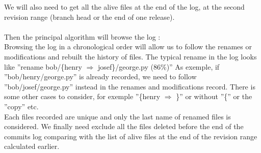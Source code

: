 We will also need to get all the alive files at the end of the log, at the second revision range (branch head or the end of one release).\\\\
Then the principal algorithm will browse the log :\\
Browsing the log in a chronological order will allow us to follow the renames or modifications and rebuilt the history of files.
The typical rename in the log looks like ''rename bob/\{henry $\Rightarrow$ josef\}/george.py (86\%)''
As exemple, if ''bob/henry/george.py'' is already recorded, we need to follow ''bob/josef/george.py'' instead in the renames and modifications record.
There is some other cases to consider, for exemple ''\{henry $\Rightarrow$ \}'' or without ''\{'' or the ''copy'' etc.\\
Each files recorded are unique and only the last name of renamed files is considered.
We finally need exclude all the files deleted before the end of the commits log comparing with the list of alive files at the end of the revision range calculated earlier.\\ 	
\label{subsec:Process}
		
\label{sec:methodology}
